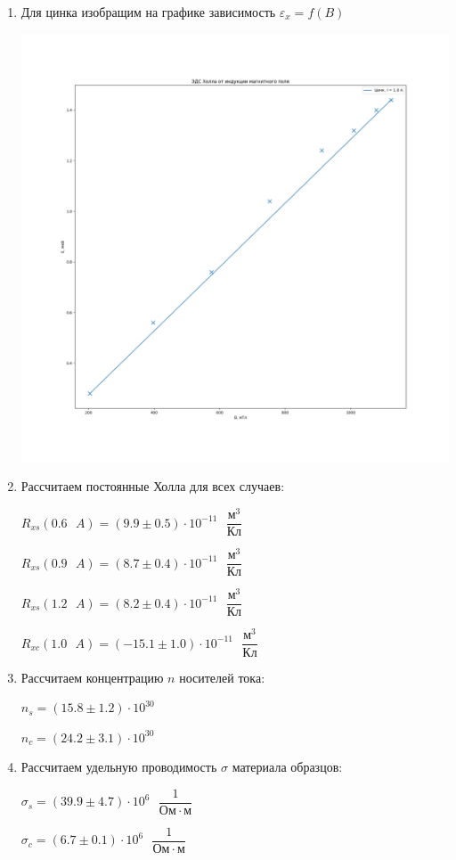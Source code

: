 \documentclass[a4paper, 12pt]{article}
\newcommand{\eps}{\varepsilon}
\begin{document}
\begin{enumerate}
        \item Для цинка изобращим на графике зависимость $\eps_x = f(B)$
        
        \includegraphics[scale=0.3]{graph3.png}

        \item Рассчитаем постоянные Холла для всех случаев:
        
        $R_{xs}(0.6 \text{ } A) = (9.9 \pm 0.5) \cdot 10^{-11} \text{ } \dfrac{м^3}{Кл}$

        $R_{xs}(0.9 \text{ } A) = (8.7 \pm 0.4) \cdot 10^{-11} \text{ } \dfrac{м^3}{Кл}$
        
        $R_{xs}(1.2 \text{ } A) = (8.2 \pm 0.4) \cdot 10^{-11} \text{ } \dfrac{м^3}{Кл}$

        $R_{xc}(1.0 \text{ } A) = (-15.1 \pm 1.0) \cdot 10^{-11} \text{ } \dfrac{м^3}{Кл}$

        \item Рассчитаем концентрацию $n$ носителей тока:
        
        $n_s = (15.8 \pm 1.2) \cdot 10^{30}$
        
        $n_c = (24.2 \pm 3.1) \cdot 10^{30}$

        \item Рассчитаем удельную проводимость $\sigma$ материала образцов:
        
        $\sigma_s = (39.9 \pm 4.7) \cdot 10^6 \text{ } \dfrac{1}{Ом \cdot м}$

        $\sigma_c = (6.7 \pm 0.1) \cdot 10^6 \text{ } \dfrac{1}{Ом \cdot м}$
    \end{enumerate}
   
\end{document}
